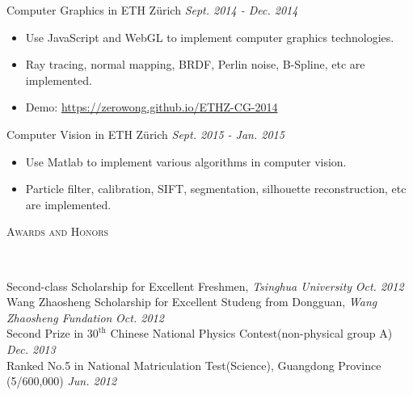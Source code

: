 \documentclass[a4paper]{article}
\newenvironment{changemargin}[2]{%
  \begin{list}{}{%
    \setlength{\topsep}{0pt}%
    \setlength{\leftmargin}{#1}%
    \setlength{\rightmargin}{#2}%
    \setlength{\listparindent}{\parindent}%
    \setlength{\itemindent}{\parindent}%
    \setlength{\parsep}{\parskip}%
  }%
  \item[]}{\end{list}
}
\newcommand{\lineover}{
	\begin{changemargin}{-0.05in}{-0.05in}
		\vspace*{-8pt}
		\hrulefill \\
		\vspace*{-2pt}
	\end{changemargin}
}
\newcommand{\header}[1]{
	\begin{changemargin}{-0.5in}{-0.5in}
		\scshape{#1}\\
  	\lineover
	\end{changemargin}
}
\newenvironment{body} {
	\vspace*{-16pt}
	\begin{changemargin}{-0.25in}{-0.5in}
  }	
	{\end{changemargin}
}
\begin{document}
\begin{body}
	\vspace{14pt}
	Computer Graphics in ETH Z\"urich \hfill \emph{Sept. 2014 - Dec. 2014}
	\begin{itemize}
	\itemsep 0pt
	\item Use JavaScript and WebGL to implement computer graphics technologies.
	\item Ray tracing, normal mapping, BRDF, Perlin noise, B-Spline, etc are implemented.
	\item Demo: \href{https://zerowong.github.io/ETHZ-CG-2014}{https://zerowong.github.io/ETHZ-CG-2014}
	\end{itemize}
	\smallskip
	Computer Vision in ETH Z\"urich \hfill \emph{Sept. 2015 - Jan. 2015}
	\begin{itemize}
	\itemsep 0pt
	\item Use Matlab to implement various algorithms in computer vision.
	\item Particle filter, calibration, SIFT, segmentation, silhouette reconstruction, etc are implemented.
	\end{itemize}
	\smallskip

\end{body}
\smallskip
\smallskip

\header{Awards and Honors}

\begin{body}
	\vspace{14pt}
	Second-class Scholarship for Excellent Freshmen, \emph{Tsinghua University} \hfill{} \emph{Oct. 2012}\\
	\smallskip
	Wang Zhaosheng Scholarship for Excellent Studeng from Dongguan, \emph{Wang Zhaosheng Fundation} \hfill{} \emph{Oct. 2012}\\
	\smallskip
	Second Prize in $30^{\mathrm{th}}$ Chinese National Physics Contest(non-physical group A) \hfill{} \emph{Dec. 2013}\\
	\smallskip
	Ranked No.5 in National Matriculation Test(Science), Guangdong Province (5/600,000) \hfill{} \emph{Jun. 2012}
\end{body}

\smallskip
\smallskip


\end{document}

